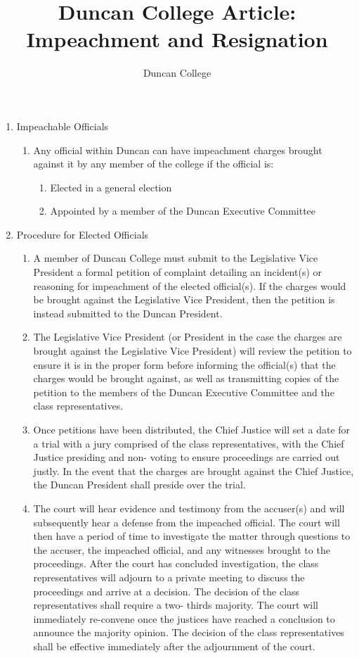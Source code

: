 \documentclass[11pt]{amsart}
\title{Duncan College Article: Impeachment and Resignation}
\author{Duncan College}
\begin{document}
\maketitle
\begin{enumerate}
	\item Impeachable Officials
	\begin{enumerate}
		\item Any official within Duncan can have impeachment charges brought against it by any
member of the college if the official is:
		\begin{enumerate}
			\item Elected in a general election
			\item Appointed by a member of the Duncan Executive Committee
		\end{enumerate}
	\end{enumerate}
	\item Procedure for Elected Officials
	\begin{enumerate}
		\item A member of Duncan College must submit to the Legislative Vice President a formal
petition of complaint detailing an incident(s) or reasoning for impeachment of the elected official(s). If the charges would be brought against the Legislative Vice President, then the petition is instead submitted to the Duncan President.
		\item The Legislative Vice President (or President in the case the charges are brought against the Legislative Vice President) will review the petition to ensure it is in the proper form before informing the official(s) that the charges would be brought against, as well as transmitting copies of the petition to the members of the Duncan Executive Committee and the class representatives.
		\item Once petitions have been distributed, the Chief Justice will set a date for a trial with a jury comprised of the class representatives, with the Chief Justice presiding and non- voting to ensure proceedings are carried out justly. In the event that the charges are brought against the Chief Justice, the Duncan President shall preside over the trial.
		\item The court will hear evidence and testimony from the accuser(s) and will subsequently hear a defense from the impeached official. The court will then have a period of time
to investigate the matter through questions to the accuser, the impeached official, and any witnesses brought to the proceedings. After the court has concluded investigation, the class representatives will adjourn to a private meeting to discuss the proceedings and arrive at a decision. The decision of the class representatives shall require a two- thirds majority. The court will immediately re-convene once the justices have reached a conclusion to announce the majority opinion. The decision of the class representatives shall be effective immediately after the adjournment of the court.

\end{enumerate}
\end{enumerate}
\end{document}
